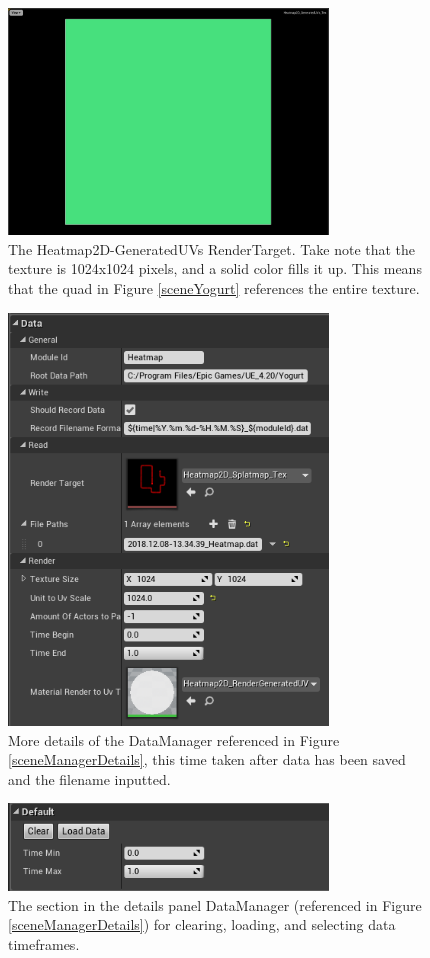 \documentclass[journal]{IEEEtran}
\begin{document}
\begin{figure}[ht]
\includegraphics[width=8.5cm]{"generatedUVs"}
\caption{The Heatmap2D-GeneratedUVs RenderTarget. Take note that the texture is 1024x1024 pixels, and a solid color fills it up. This means that the quad in Figure \ref{sceneYogurt} references the entire texture.}
\label{generatedUVs}
\end{figure}

\begin{figure}[ht]
\includegraphics[width=8.5cm]{"scene_manager_details_expanded"}
\caption{More details of the DataManager referenced in Figure \ref{sceneManagerDetails}, this time taken after data has been saved and the filename inputted.}
\label{sceneManagerDetailsExpanded}
\end{figure}

\begin{figure}[ht]
\includegraphics[width=8.5cm]{"scene_manager_details_loading"}
\caption{The section in the details panel DataManager (referenced in Figure \ref{sceneManagerDetails}) for clearing, loading, and selecting data timeframes.}
\label{sceneManagerDetailsLoading}
\end{figure}
\end{document}
